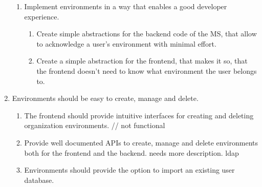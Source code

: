\begin{enumerate}
\begin{enumerate}
    \item Implement environments in a way that enables a good developer experience.
    \begin{enumerate}
        \item Create simple abstractions for the backend code of the MS, that allow to acknowledge a user's environment with minimal effort.
        \item Create a simple abstraction for the frontend, that makes it so, that the frontend doesn't need to know what environment the user belongs to.
    \end{enumerate}
  \end{enumerate}
    \item Environments should be easy to create, manage and delete.
    \begin{enumerate}
        \item The frontend should provide intuitive interfaces for creating and deleting organization environments.
        // not functional
        \item Provide well documented APIs to create, manage and delete environments both for the frontend and the backend.
        needs more description. ldap
        \item Environments should provide the option to import an existing user database.
    \end{enumerate}

\end{enumerate}






